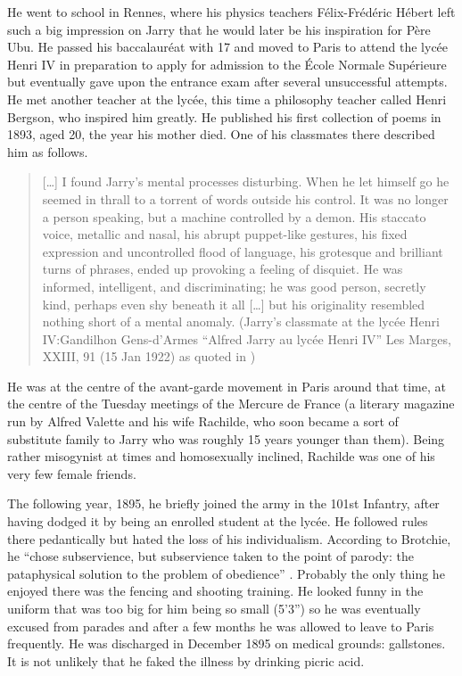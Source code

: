 He went to school in Rennes, where his physics teachers Félix-Frédéric Hébert left such a big impression on Jarry that he would later be his inspiration for Père Ubu. He passed his baccalauréat with 17 and moved to Paris to attend the lycée Henri IV in preparation to apply for admission to the École Normale Supérieure but eventually gave upon the entrance exam after several unsuccessful attempts. He met another teacher at the lycée, this time a philosophy teacher called Henri Bergson, who inspired him greatly. He published his first collection of poems in 1893, aged 20, the year his mother died. One of his classmates there described him as follows.

\begin{quote}
  [\ldots] I found Jarry's mental processes disturbing. When he let himself go he seemed in thrall to a torrent of words outside his control. It was no longer a person speaking, but a machine controlled by a demon. His staccato voice, metallic and nasal, his abrupt puppet-like gestures, his fixed expression and uncontrolled flood of language, his grotesque and brilliant turns of phrases, ended up provoking a feeling of disquiet. He was informed, intelligent, and discriminating; he was good person, secretly kind, perhaps even shy beneath it all [\ldots] but his originality resembled nothing short of a mental anomaly. (Jarry's classmate at the lycée Henri IV:\@ Gandilhon Gens-d'Armes ``Alfred Jarry au lycée Henri IV'' Les Marges, XXIII, 91 (15 Jan 1922) as quoted in \autocite{Brotchie2011})
\end{quote}

He was at the centre of the avant-garde movement in Paris around that time, at the centre of the Tuesday meetings of the Mercure de France (a literary magazine run by Alfred Valette and his wife Rachilde, who soon became a sort of substitute family to Jarry who was roughly 15 years younger than them). Being rather misogynist at times and homosexually inclined, Rachilde was one of his very few female friends.

The following year, 1895, he briefly joined the army in the 101st Infantry, after having dodged it by being an enrolled student at the lycée. He followed rules there pedantically but hated the loss of his individualism. According to Brotchie, he ``chose subservience, but subservience taken to the point of parody: the pataphysical solution to the problem of obedience'' \autocite{Brotchie2011}. Probably the only thing he enjoyed there was the fencing and shooting training. He looked funny in the uniform that was too big for him being so small (5'3'') so he was eventually excused from parades and after a few months he was allowed to leave to Paris frequently. He was discharged in December 1895 on medical grounds: gallstones. It is not unlikely that he faked the illness by drinking picric acid.

